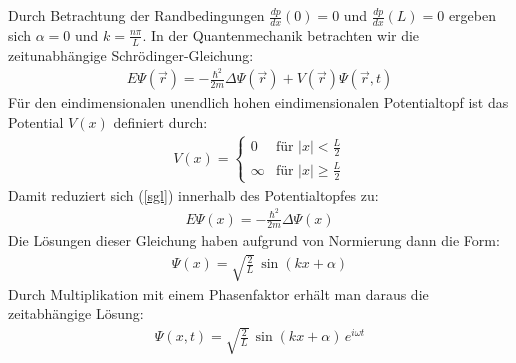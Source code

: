 \documentclass[german,  %
parskip=full,  %
]{scrartcl}
\begin{document}
Durch Betrachtung der Randbedingungen $\frac{dp}{dx}\left(0\right)=0$ und $\frac{dp}{dx}\left(L\right)=0$ ergeben sich $\alpha=0$ und $k =\frac{n \pi}{L}$.
\newline
\newline In der Quantenmechanik betrachten wir die zeitunabhängige Schrödinger-Gleichung:
\begin{align}
\label{sgl}E\Psi(\vec{r}) = -\frac{\hbar^2}{2m} \Delta \Psi(\vec{r}) + V(\vec{r})\Psi(\vec{r},t)
\end{align}
Für den eindimensionalen unendlich hohen eindimensionalen Potentialtopf ist das Potential $V(x)$ definiert durch:
\begin{align}
V(x)=
  \begin{cases}
    0 & \text{für }|x|<\frac{L}{2}\\
	\infty & \text{für }|x| \geq \frac{L}{2}
  \end{cases}
\end{align}
Damit reduziert sich (\ref{sgl}) innerhalb des Potentialtopfes zu:
\begin{align}
E\Psi(x) = -\frac{\hbar^2}{2m} \Delta \Psi(x)
\end{align}
Die Lösungen dieser Gleichung haben aufgrund von Normierung dann die Form:
\begin{align}
\Psi(x)=\sqrt{\frac{2}{L}}\,\sin(kx+\alpha)
\end{align}
Durch Multiplikation mit einem Phasenfaktor erhält man daraus die zeitabhängige Lösung:
\begin{align}
\Psi(x,t)=\sqrt{\frac{2}{L}} \, \sin(kx+\alpha) \, e^{i \omega t}
\end{align}
\end{document}
